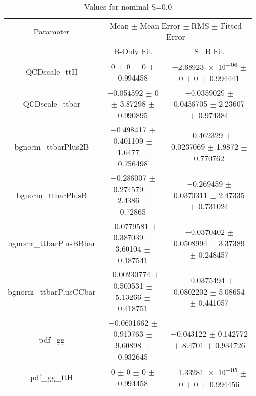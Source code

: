 \begin{table}
\centering
\caption{Values for nominal S=0.0}
\begin{tabular}{ccc}
\toprule
Parameter & \multicolumn{2}{c}{Mean $\pm$ Mean Error $\pm$ RMS $\pm$ Fitted Error}\\
 & B-Only Fit & S+B Fit\\
\midrule
QCDscale\_ttH & \num{0} $\pm$ \num{0} $\pm$ \num{0} $\pm$ \num{0.994458} & \num{-2.68923e-06} $\pm$ \num{0} $\pm$ \num{0} $\pm$ \num{0.994441}\\
QCDscale\_ttbar & \num{-0.054592} $\pm$ \num{0} $\pm$ \num{3.87298} $\pm$ \num{0.990895} & \num{-0.0359029} $\pm$ \num{0.0456705} $\pm$ \num{2.23607} $\pm$ \num{0.974384}\\
bgnorm\_ttbarPlus2B & \num{-0.498417} $\pm$ \num{0.401109} $\pm$ \num{1.6477} $\pm$ \num{0.756498} & \num{-0.462329} $\pm$ \num{0.0237069} $\pm$ \num{1.9872} $\pm$ \num{0.770762}\\
bgnorm\_ttbarPlusB & \num{-0.286007} $\pm$ \num{0.274579} $\pm$ \num{2.4386} $\pm$ \num{0.72865} & \num{-0.269459} $\pm$ \num{0.0370311} $\pm$ \num{2.47335} $\pm$ \num{0.731024}\\
bgnorm\_ttbarPlusBBbar & \num{-0.0779581} $\pm$ \num{0.387039} $\pm$ \num{3.60104} $\pm$ \num{0.187541} & \num{-0.0370402} $\pm$ \num{0.0508994} $\pm$ \num{3.37389} $\pm$ \num{0.248457}\\
bgnorm\_ttbarPlusCCbar & \num{-0.00230774} $\pm$ \num{0.500531} $\pm$ \num{5.13266} $\pm$ \num{0.418751} & \num{-0.0375494} $\pm$ \num{0.0802202} $\pm$ \num{5.08654} $\pm$ \num{0.441057}\\
pdf\_gg & \num{-0.0601662} $\pm$ \num{0.910763} $\pm$ \num{9.60898} $\pm$ \num{0.932645} & \num{-0.043122} $\pm$ \num{0.142772} $\pm$ \num{8.4701} $\pm$ \num{0.934726}\\
pdf\_gg\_ttH & \num{0} $\pm$ \num{0} $\pm$ \num{0} $\pm$ \num{0.994458} & \num{-1.33281e-05} $\pm$ \num{0} $\pm$ \num{0} $\pm$ \num{0.994456}\\
\bottomrule
\end{tabular}
\end{table}